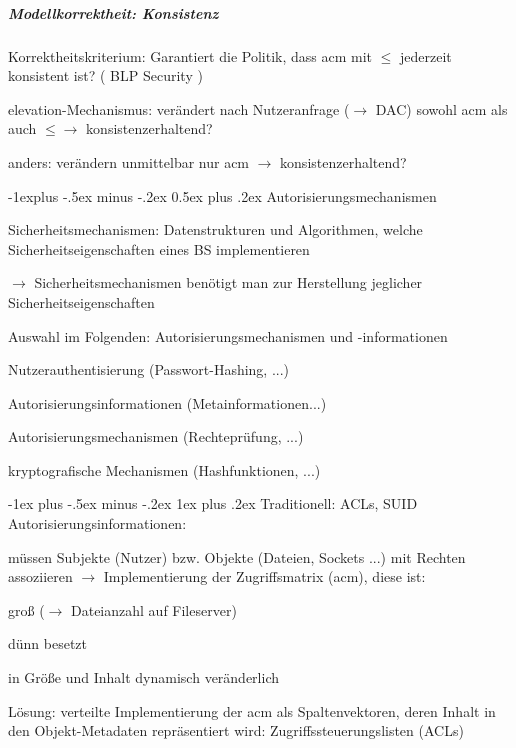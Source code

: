 \documentclass[a4paper]{article}
\makeatletter
\renewcommand{\subsection}{\@startsection{subsection}{2}{0mm}%
 {-1explus -.5ex minus -.2ex}%
 {0.5ex plus .2ex}%
 {\normalfont\normalsize\bfseries}}
\renewcommand{\subsubsection}{\@startsection{subsubsection}{3}{0mm}%
 {-1ex plus -.5ex minus -.2ex}%
 {1ex plus .2ex}%
 {\normalfont\small\bfseries}}
\makeatother
\begin{document}
\begin{multicols}{3}
    \subparagraph{Modellkorrektheit: Konsistenz}
    \begin{itemize*}
        \item Korrektheitskriterium: Garantiert die Politik, dass acm mit $\leq$ jederzeit konsistent ist? ( BLP Security )
        \item elevation-Mechanismus: verändert nach Nutzeranfrage ($\rightarrow$ DAC) sowohl acm als auch $\leq\rightarrow$ konsistenzerhaltend?
        \item anders: verändern unmittelbar nur acm $\rightarrow$ konsistenzerhaltend?
    \end{itemize*}

    \subsection{Autorisierungsmechanismen}
    \begin{itemize*}
        \item Sicherheitsmechanismen: Datenstrukturen und Algorithmen, welche Sicherheitseigenschaften eines BS implementieren
        \item[$\rightarrow$] Sicherheitsmechanismen benötigt man zur Herstellung jeglicher Sicherheitseigenschaften
        \item Auswahl im Folgenden: Autorisierungsmechanismen und -informationen
        \begin{itemize*}
            \item Nutzerauthentisierung (Passwort-Hashing, ...)
            \item Autorisierungsinformationen (Metainformationen...)
            \item Autorisierungsmechanismen (Rechteprüfung, ...)
            \item kryptografische Mechanismen (Hashfunktionen, ...)
        \end{itemize*}
    \end{itemize*}

    \subsubsection{Traditionell: ACLs, SUID}
    Autorisierungsinformationen:
    \begin{itemize*}
        \item müssen Subjekte (Nutzer) bzw. Objekte (Dateien, Sockets ...) mit Rechten assoziieren $\rightarrow$ Implementierung der Zugriffsmatrix (acm), diese ist:
        \begin{itemize*}
            \item groß ($\rightarrow$ Dateianzahl auf Fileserver)
            \item dünn besetzt
            \item in Größe und Inhalt dynamisch veränderlich
        \end{itemize*}
        \item Lösung: verteilte Implementierung der acm als Spaltenvektoren, deren Inhalt in den Objekt-Metadaten repräsentiert wird: Zugriffssteuerungslisten (ACLs)
    \end{itemize*}


\end{multicols}
\end{document}

